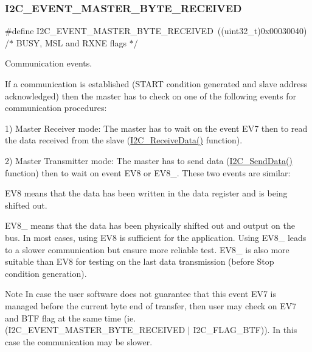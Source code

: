 \subsubsection{\texorpdfstring{I2\+C\+\_\+\+E\+V\+E\+N\+T\+\_\+\+M\+A\+S\+T\+E\+R\+\_\+\+B\+Y\+T\+E\+\_\+\+R\+E\+C\+E\+I\+V\+ED}{I2C\_EVENT\_MASTER\_BYTE\_RECEIVED}}
{\footnotesize\ttfamily \#define I2\+C\+\_\+\+E\+V\+E\+N\+T\+\_\+\+M\+A\+S\+T\+E\+R\+\_\+\+B\+Y\+T\+E\+\_\+\+R\+E\+C\+E\+I\+V\+ED~((uint32\+\_\+t)0x00030040)  /$\ast$ B\+U\+S\+Y, M\+S\+L and R\+X\+N\+E flags $\ast$/}



Communication events. 

If a communication is established (S\+T\+A\+RT condition generated and slave address acknowledged) then the master has to check on one of the following events for communication procedures\+:

1) Master Receiver mode\+: The master has to wait on the event E\+V7 then to read the data received from the slave (\hyperlink{group___i2_c___exported___functions_gaeaaa4b6f77f50eb57465148c55d27fb2}{I2\+C\+\_\+\+Receive\+Data()} function).

2) Master Transmitter mode\+: The master has to send data (\hyperlink{group___i2_c___exported___functions_ga7bd9e70b8eafde0dd5eb42b0d95fe1a9}{I2\+C\+\_\+\+Send\+Data()} function) then to wait on event E\+V8 or E\+V8\+\_. These two events are similar\+:
\begin{DoxyItemize}
\item E\+V8 means that the data has been written in the data register and is being shifted out.
\item E\+V8\+\_ means that the data has been physically shifted out and output on the bus. In most cases, using E\+V8 is sufficient for the application. Using E\+V8\+\_ leads to a slower communication but ensure more reliable test. E\+V8\+\_ is also more suitable than E\+V8 for testing on the last data transmission (before Stop condition generation).
\end{DoxyItemize}

\begin{DoxyNote}{Note}
In case the user software does not guarantee that this event E\+V7 is managed before the current byte end of transfer, then user may check on E\+V7 and B\+TF flag at the same time (ie. (I2\+C\+\_\+\+E\+V\+E\+N\+T\+\_\+\+M\+A\+S\+T\+E\+R\+\_\+\+B\+Y\+T\+E\+\_\+\+R\+E\+C\+E\+I\+V\+ED $\vert$ I2\+C\+\_\+\+F\+L\+A\+G\+\_\+\+B\+TF)). In this case the communication may be slower. 
\end{DoxyNote}


